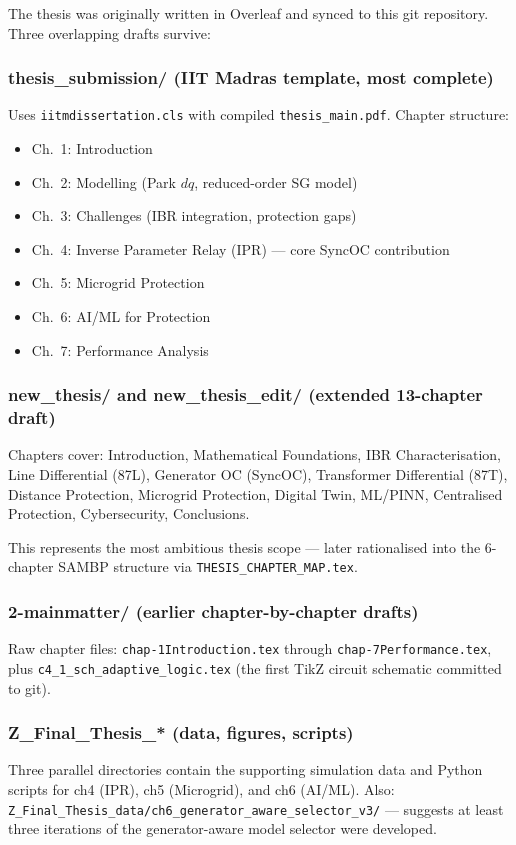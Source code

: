 \documentclass[11pt,a4paper]{article}
\begin{document}
The thesis was originally written in Overleaf and synced to this git repository.
Three overlapping drafts survive:

\subsubsection*{thesis\_submission/ (IIT Madras template, most complete)}
Uses \texttt{iitmdissertation.cls} with compiled \texttt{thesis\_main.pdf}.
Chapter structure:
\begin{itemize}[noitemsep]
  \item Ch.\ 1: Introduction
  \item Ch.\ 2: Modelling (Park $dq$, reduced-order SG model)
  \item Ch.\ 3: Challenges (IBR integration, protection gaps)
  \item Ch.\ 4: Inverse Parameter Relay (IPR) — core SyncOC contribution
  \item Ch.\ 5: Microgrid Protection
  \item Ch.\ 6: AI/ML for Protection
  \item Ch.\ 7: Performance Analysis
\end{itemize}

\subsubsection*{new\_thesis/ and new\_thesis\_edit/ (extended 13-chapter draft)}
Chapters cover: Introduction, Mathematical Foundations, IBR Characterisation,
Line Differential (87L), Generator OC (SyncOC), Transformer Differential (87T),
Distance Protection, Microgrid Protection, Digital Twin, ML/PINN,
Centralised Protection, Cybersecurity, Conclusions.

This represents the most ambitious thesis scope — later rationalised into the
6-chapter SAMBP structure via \texttt{THESIS\_CHAPTER\_MAP.tex}.

\subsubsection*{2-mainmatter/ (earlier chapter-by-chapter drafts)}
Raw chapter files: \texttt{chap-1Introduction.tex} through
\texttt{chap-7Performance.tex}, plus \texttt{c4\_1\_sch\_adaptive\_logic.tex}
(the first TikZ circuit schematic committed to git).

\subsubsection*{Z\_Final\_Thesis\_* (data, figures, scripts)}
Three parallel directories contain the supporting simulation data and Python
scripts for ch4 (IPR), ch5 (Microgrid), and ch6 (AI/ML). Also:
\texttt{Z\_Final\_Thesis\_data/ch6\_generator\_aware\_selector\_v3/} — suggests
at least three iterations of the generator-aware model selector were developed.
\end{document}
